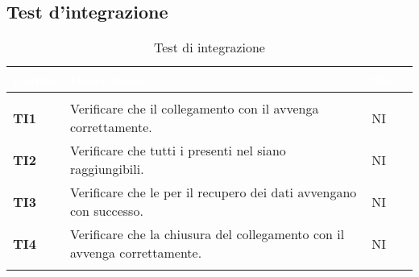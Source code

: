 \subsection{Test d'integrazione}
{

\renewcommand{\arraystretch}{1.5}
\renewcommand\extrarowheight{1.5pt}
\setlength\arrayrulewidth{1pt}
\begin{longtable}{ C{1.5cm} | C{12cm}| C{1.5cm} } 
		\textcolor{white}{\textbf{Codice}} & 
		\textcolor{white}{\textbf{Descrizione}} & 
		\textcolor{white}{\textbf{Stato}} \\
		\endfirsthead
		\\
	    \endfoot
	    \endlastfoot

\textbf{TI1} & 
Verificare che il collegamento con il  avvenga correttamente. & 
NI\\

\textbf{TI2} & 
Verificare che tutti i  presenti nel  siano raggiungibili. & 
NI\\

\textbf{TI3} & 
Verificare che le  per il recupero dei dati avvengano con successo. & 
NI\\

\textbf{TI4} & 
Verificare che la chiusura del collegamento con il  avvenga correttamente. & 
NI\\

\caption{Test di integrazione}
\label{testIntegrazione}
\end{longtable}
}
